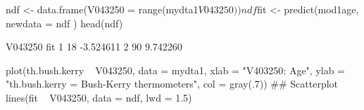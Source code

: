 \begin{Schunk}
\begin{Sinput}
 ndf <- data.frame(V043250 = range(mydta1$V043250))
 ndf$fit <- predict(mod1age, newdata = ndf )
 head(ndf)
\end{Sinput}
\begin{Soutput}
  V043250       fit
1      18 -3.524611
2      90  9.742260
\end{Soutput}
\begin{Sinput}
 plot(th.bush.kerry ~ V043250, data = mydta1, xlab = "V403250: Age", ylab = "th.bush.kerry = Bush-Kerry thermometers",  col = gray(.7)) ## Scatterplot
 lines(fit ~ V043250, data = ndf, lwd = 1.5)
\end{Sinput}
\end{Schunk}

